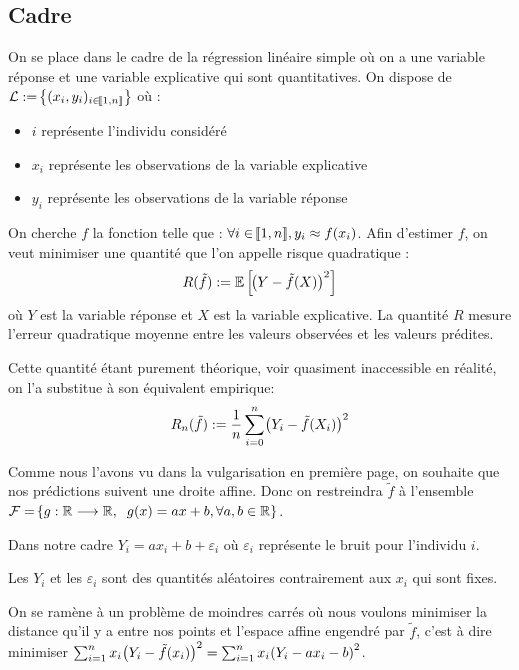 \documentclass[12pt]{article}
\newcommand{\bk}{\bigskip}
\newcommand{\acc}[1]{\hspace{-0.05cm}\left\{#1 \right\}}
\newcommand{\parr}[1]{\hspace{-0.05cm}\left(#1 \right)}
\newcommand{\rect}[1]{\left[ #1 \right]}
\newcommand{\braks}[1]{\hspace{-0.05cm}\llbracket#1 \rrbracket}
\newcommand{\mc}[1]{\mathcal{#1}}
\newcommand{\mb}[1]{\mathbb{#1}}
\newcommand{\lra}{\longrightarrow}
\begin{document}
	\subsection{Cadre}
	On se place dans le cadre de la régression linéaire simple où on a une variable réponse et une variable explicative qui sont quantitatives.
	On dispose de $\mc{L} := \acc{(x_{i},y_{i})_{i \in \braks{1,n}}}$ où :
	\begin{itemize}[label*=\textbullet]
		\item $i$ représente l'individu considéré 
		\item $x_{i}$ représente les observations de la variable explicative
		\item $y_{i}$ représente les observations de la variable réponse
	\end{itemize}
	On cherche $f$ la fonction telle que : $\forall i \in \braks{1,n}, y_i \approx f(x_i)$. Afin d'estimer $f$, on veut minimiser une quantité que l'on appelle risque quadratique : 
	\begin{equation*}
		R(\tilde{f}) := \mb{E}\rect{\parr{Y- \tilde{f}(X)}^{2}}
	\end{equation*}
	où $Y$ est la variable réponse et $X$ est la variable explicative. La quantité $R$ mesure l'erreur quadratique moyenne entre les valeurs observées et les valeurs prédites.
	

	Cette quantité étant purement théorique, voir quasiment inaccessible en réalité,  on l'a substitue à son équivalent empirique: 
	\begin{equation*}
		R_{n}(\tilde{f}) := \dfrac{1}{n}\sum_{i=0}^{n}\parr{Y_{i} -\tilde{f}(X_i)}^{2}
	\end{equation*}
	
	Comme nous l'avons vu dans la vulgarisation en première page, on souhaite que nos prédictions suivent une droite affine. 
	Donc on restreindra $\tilde{f}$ à l'ensemble $\mc{F} = \acc{g : \mb{R}\lra \mb{R} , \hspace{2mm} g(x)= ax + b, \forall a,b \in \mathbb{R}}$.
	
	Dans notre cadre $Y_{i} = ax_{i}+ b + \varepsilon_{i}$ où $\varepsilon_i$ représente le bruit pour l'individu $i$.
	
	Les $Y_{i}$ et les $\varepsilon_{i}$ sont des quantités aléatoires contrairement aux $x_{i}$ qui sont fixes.
	\bk 
	
	
	On se ramène à un problème de moindres carrés où nous voulons minimiser la distance qu'il y a entre nos points et l'espace affine engendré par $\tilde{f}$, c'est à dire minimiser $\sum_{i=1}^{n}x_i \parr{Y_i - \tilde{f}(x_i)}^{2}=\sum_{i=1}^{n}x_i \parr{Y_i - ax_{i} - b}^{2}$.
	
\end{document}
